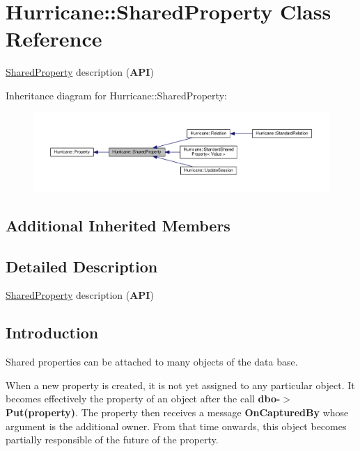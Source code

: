 \hypertarget{classHurricane_1_1SharedProperty}{}\section{Hurricane\+:\+:Shared\+Property Class Reference}
\label{classHurricane_1_1SharedProperty}


\hyperlink{classHurricane_1_1SharedProperty}{Shared\+Property} description ({\bfseries A\+PI})  




Inheritance diagram for Hurricane\+:\+:Shared\+Property\+:\nopagebreak
\begin{figure}[H]
\begin{center}
\leavevmode
\includegraphics[width=350pt]{classHurricane_1_1SharedProperty__inherit__graph}
\end{center}
\end{figure}
\subsection*{Additional Inherited Members}


\subsection{Detailed Description}
\hyperlink{classHurricane_1_1SharedProperty}{Shared\+Property} description ({\bfseries A\+PI}) 

\hypertarget{classHurricane_1_1SharedProperty_secSharedPropertyIntro}{}\subsection{Introduction}\label{classHurricane_1_1SharedProperty_secSharedPropertyIntro}
Shared properties can be attached to many objects of the data base.

When a new property is created, it is not yet assigned to any particular object. It becomes effectively the property of an object after the call {\bfseries dbo-\/$>$Put(property)}. The property then receives a message {\bfseries On\+Captured\+By} whose argument is the additional owner. From that time onwards, this object becomes partially responsible of the future of the property.


